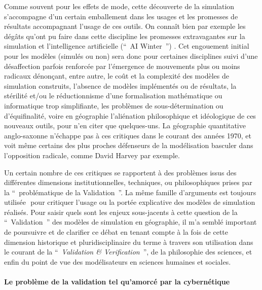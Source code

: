 Comme souvent pour les effets de mode, cette découverte de la simulation s'accompagne d'un certain emballement dans les usages et les promesses de résultats accompagnant l'usage de ces outils. On connaît bien par exemple les dégâts qu'ont pu faire dans cette discipline les promesses extravagantes sur la simulation et l'intelligence artificielle (\foreignquote{english}{ AI Winter }) \autocite{Crevier1993}. 
Cet engouement initial pour les modèles (simulés ou non) sera donc pour certaines disciplines suivi d'une désaffection parfois renforcée par l'émergence de mouvements plus ou moins radicaux dénonçant, entre autre, le coût et la complexité des modèles de simulation construits, l'absence de modèles implémentés ou de résultats, la stérilité et/ou le réductionnisme d'une formalisation mathématique ou informatique trop simplifiante, les problèmes de sous-détermination ou d'équifinalité, voire en géographie l'aliénation philosophique et idéologique de ces nouveaux outils, pour n'en citer que quelques-uns. La géographie quantitative anglo-saxonne n'échappe pas à ces critiques dans le courant des années 1970, et voit même certains des plus proches défenseurs de la modélisation basculer dans l'opposition radicale, comme David Harvey par exemple.

Un certain nombre de ces critiques se rapportent à des problèmes issus des différentes dimensions institutionnelles, techniques, ou philosophiques prises par la \enquote{ problématique de la Validation }. La même famille d'arguments est toujours utilisée \autocites{Amblard2006, Waldherr2013}⁠ pour critiquer l'usage ou la portée explicative des modèles de simulation réalisés. Pour saisir quels sont les enjeux sous-jacents à cette question de la \enquote{ Validation } des modèles de simulation en géographie, il m'a semblé important de poursuivre et de clarifier ce débat en tenant compte à la fois de cette dimension historique et pluridisciplinaire du terme à travers son utilisation dans le courant de la \enquote{ \textit{Validation \& Verification} }, de la philosophie des sciences, et enfin du point de vue des modélisateurs en sciences humaines et sociales. 

\paragraph*{Le problème de la validation tel qu’amorcé par la cybernétique}

